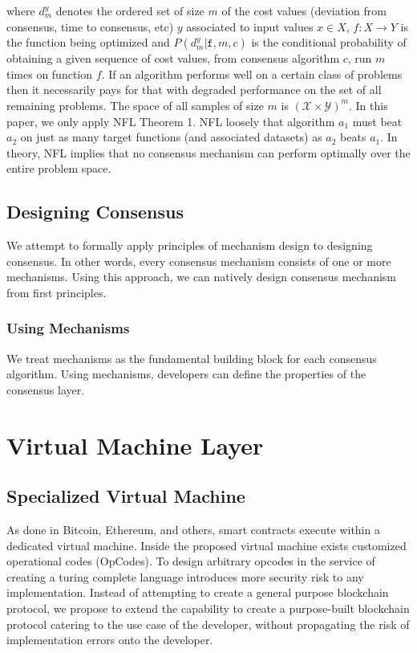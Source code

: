 \documentclass[12pt, titlepage, twocolumn]{report}
\begin{document}
where \(\displaystyle d_{m}^{y}\) denotes the ordered set of size \(\displaystyle m\) of the cost values (deviation from consensus, time to consensus, etc) \(\displaystyle y\) associated to input values \(\displaystyle x\in X\), \(\displaystyle f:X\rightarrow Y\) is the function being optimized and \(P( d_{m}^{y} \vert \texttt{f}, m, c )\) is the conditional probability of obtaining a given sequence of cost values, from consensus algorithm \( \displaystyle c \), run \( \displaystyle m\) times on function \( \displaystyle f \). If an algorithm performs well on a certain class of problems then it necessarily pays for that with degraded performance on the set of all remaining problems. The space of all samples of size \(m\) is \((\mathcal{X} \times \mathcal{Y})^m \). In this paper, we only apply NFL Theorem 1. NFL loosely that algorithm \(a_1\) must beat \(a_2\) on just as many target functions (and associated datasets) as \(a_2\) beats \(a_1\). In theory, NFL implies that no consensus mechanism can perform optimally over the entire problem space.


\section{Designing Consensus}
We attempt to formally apply principles of mechanism design to designing consensus. In other words, every consensus mechanism consists of one or more mechanisms. Using this approach, we can natively design consensus mechanism from first principles.

\subsection{Using Mechanisms}
We treat mechanisms as the fundamental building block for each consensus algorithm. Using mechanisms, developers can define the properties of the consensus layer. 


\chapter{Virtual Machine Layer}

\section{Specialized Virtual Machine}
As done in Bitcoin, Ethereum, and others, smart contracts execute within a dedicated virtual machine. Inside the proposed virtual machine exists customized operational codes (OpCodes). To design arbitrary opcodes in the service of creating a turing complete language introduces more security risk to any implementation. Instead of attempting to create a general purpose blockchain protocol, we propose to extend the capability to create a purpose-built blockchain protocol catering to the use case of the developer, without propagating the risk of implementation errors onto the developer.
\end{document}
